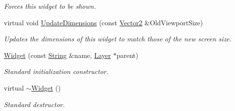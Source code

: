 \begin{DoxyCompactItemize}
\begin{DoxyCompactList}\small\item\em Forces this widget to be shown. \item\end{DoxyCompactList}\item 
virtual void \hyperlink{classphys_1_1UI_1_1Widget_acbda7003549c6caac46078c034657929}{UpdateDimensions} (const \hyperlink{classphys_1_1Vector2}{Vector2} \&OldViewportSize)
\begin{DoxyCompactList}\small\item\em Updates the dimensions of this widget to match those of the new screen size. \item\end{DoxyCompactList}\item 
\hyperlink{classphys_1_1UI_1_1Widget_a7f992cc7513f1e41795b3569aa8faced}{Widget} (const \hyperlink{namespacephys_aa03900411993de7fbfec4789bc1d392e}{String} \&name, \hyperlink{classphys_1_1UI_1_1Layer}{Layer} $\ast$parent)
\begin{DoxyCompactList}\small\item\em Standard initialization constructor. \item\end{DoxyCompactList}\item 
\hypertarget{classphys_1_1UI_1_1Widget_a95bde61e93544334b376938274617d15}{
virtual \hyperlink{classphys_1_1UI_1_1Widget_a95bde61e93544334b376938274617d15}{$\sim$Widget} ()}
\label{classphys_1_1UI_1_1Widget_a95bde61e93544334b376938274617d15}

\begin{DoxyCompactList}\small\item\em Standard destructor. \item\end{DoxyCompactList}\end{DoxyCompactItemize}
